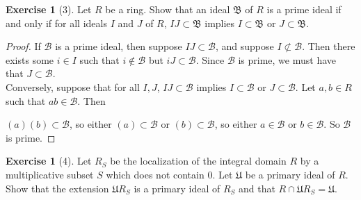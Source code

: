 \documentclass[reqno]{amsart}
\theoremstyle{definition}
\newtheorem{exercise}[theorem]{Exercise}
\theoremstyle{remark}
\begin{document}
\begin{exercise}[3]
    Let $R$ be a ring. Show that an ideal
    $\mathfrak{B}$ of $R$ is a prime ideal if and only
    if for all ideals $I$ and $J$ of $R$,
    $IJ \subset \mathfrak{B}$ implies
    $I \subset \mathfrak{B}$ or
    $J \subset \mathfrak{B}$.
\end{exercise}

\begin{proof}
    If $\mathcal{B}$ is a prime ideal, then
    suppose $IJ \subset \mathcal{B}$, and suppose
    $I \not \subset  \mathcal{B}$.
    Then there exists some $i \in I$ such that
    $i \not\in \mathcal{B}$ but
    $i J \subset \mathcal{B}$.
    Since $\mathcal{B}$ is prime,
    we must have that
    $J \subset \mathcal{B}$.\\
    Conversely, suppose that for all $I,J$,
    $IJ \subset \mathcal{B}$ implies $I \subset \mathcal{B}$
    or $J \subset \mathcal{B}$. Let
    $a,b \in R$ such that
    $ab \in \mathcal{B}$. Then

    $\left( a \right)  \left( b \right)
    \subset \mathcal{B}$, so either
    $\left( a \right)  \subset \mathcal{B}$ or
    $\left( b \right)  \subset \mathcal{B}$, so
    either $a \in \mathcal{B}$ or $b \in \mathcal{B}$.
    So $\mathcal{B}$ is prime.
\end{proof}



\begin{exercise}[4]
    Let $R_S$ be the localization of the integral domain
    $R$ by a multiplicative subset
    $S$ which does not contain $0$. Let
    $\mathfrak{U}$ be a primary ideal of
    $R$. Show that the extension
    $\mathfrak{U}R_S$ is a primary ideal of
    $R_S$ and that $R \cap \mathfrak{U}R_S =
    \mathfrak{U}$.
\end{exercise}
\end{document}
